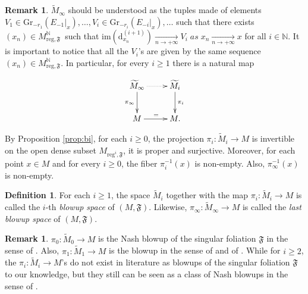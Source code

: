 \documentclass[10pt]{article}
\theoremstyle{plain}
\theoremstyle{definition}
\newtheorem{definition}[lemma]{Definition}
\newtheorem{remark}[lemma]{Remark}
\theoremstyle{remark}
\newcommand{\dd}{\mathrm{d}}
\begin{document}
\begin{remark}
    $\widetilde{M}_{\infty}$ should be understood as the tuples made of elements $V_1\in \mathrm{Gr}_{-r_1}({E_{-1}}|_x), \ldots, V_i\in \mathrm{Gr}_{-r_i}({E_{-i}}|_x),\ldots$ such that there exists $(x_n)\in M_{\mathrm{reg},\mathfrak F}^{\mathbb{N}}$\, {such that} $\mathrm{im}\left(\dd^{(i+1)}_{x_n}\right)\underset{n \to +\infty}{\longrightarrow} V_i\; as \; x_n\underset{n \to +\infty}{\longrightarrow}x$ for all $i\in \mathbb{N}$. It is important to notice that all the $V_i$'s are given by the same sequence $(x_n)\in M_{\mathrm{reg},\mathfrak F}^{\mathbb{N}}$. In particular, for every $i\geq 1$ there is a natural map

    \begin{equation*}  \xymatrix{  \widetilde M_\infty \ar@{.>}[r]\ar[d]_{\pi_\infty}&\ar[d]^{\pi_i} \widetilde M_i\\ M\ar[r]^{=}& M.}  \end{equation*}
\end{remark}

By Proposition \ref{prop:bi}, for each $i\geq 0$, the projection $\pi_i\colon \widetilde M_i\rightarrow M$ is invertible on the open dense subset $M_{\mathrm{reg}^{i}, \mathfrak{F}}$, it is proper and surjective. Moreover,  for each point $x\in M$ and for every $i\geq 0$, the fiber $\pi^{-1}_i(x)$ is non-empty. Also, $\pi^{-1}_\infty(x)$ is non-empty.

\begin{definition}
   For each $i\geq 1$, the space $\widetilde M_i$ together with the map $\pi_i\colon \widetilde M_i\to M$ is called the $i$-th \emph{blowup space} of $(M,\mathfrak F)$. Likewise, $\pi_\infty\colon\widetilde {M}_\infty\to M$ is called the \emph{last blowup space} of $(M,\mathfrak F)$. 
\end{definition}

\begin{remark}
    $\pi_0\colon \widetilde M_0\to M$ is the Nash blowup of the singular foliation $\mathfrak{F}$ in the sense of \cite{JPTS}. Also, $\pi_1\colon \widetilde M_1\to M$ is the blowup in the sense of \cite{Rossi} and of \cite{MohsenOmar}. While for $i\geq 2$, the $\pi_i\colon \widetilde M_i\to M$'s do not exist in literature as blowups of the singular foliation $\mathfrak F$ to our knowledge,  but they still can be seen as a class of Nash blowups in the sense of \cite{Ali-Sinan}.
\end{remark}
\end{document}
